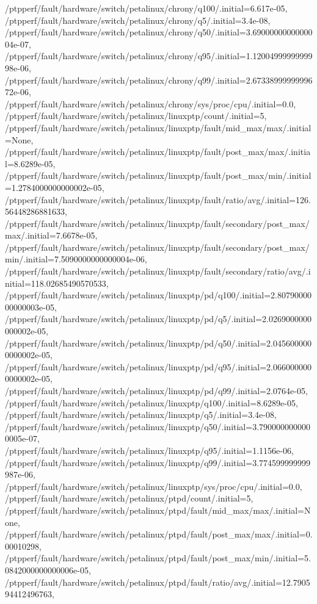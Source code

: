 {    /ptpperf/fault/hardware/switch/petalinux/chrony/q100/.initial=6.617e-05,
    /ptpperf/fault/hardware/switch/petalinux/chrony/q5/.initial=3.4e-08,
    /ptpperf/fault/hardware/switch/petalinux/chrony/q50/.initial=3.6900000000000004e-07,
    /ptpperf/fault/hardware/switch/petalinux/chrony/q95/.initial=1.1200499999999998e-06,
    /ptpperf/fault/hardware/switch/petalinux/chrony/q99/.initial=2.6733899999999672e-06,
    /ptpperf/fault/hardware/switch/petalinux/chrony/sys/proc/cpu/.initial=0.0,
    /ptpperf/fault/hardware/switch/petalinux/linuxptp/count/.initial=5,
    /ptpperf/fault/hardware/switch/petalinux/linuxptp/fault/mid_max/max/.initial=None,
    /ptpperf/fault/hardware/switch/petalinux/linuxptp/fault/post_max/max/.initial=8.6289e-05,
    /ptpperf/fault/hardware/switch/petalinux/linuxptp/fault/post_max/min/.initial=1.2784000000000002e-05,
    /ptpperf/fault/hardware/switch/petalinux/linuxptp/fault/ratio/avg/.initial=126.56448286881633,
    /ptpperf/fault/hardware/switch/petalinux/linuxptp/fault/secondary/post_max/max/.initial=7.6678e-05,
    /ptpperf/fault/hardware/switch/petalinux/linuxptp/fault/secondary/post_max/min/.initial=7.5090000000000004e-06,
    /ptpperf/fault/hardware/switch/petalinux/linuxptp/fault/secondary/ratio/avg/.initial=118.02685490570533,
    /ptpperf/fault/hardware/switch/petalinux/linuxptp/pd/q100/.initial=2.8079000000000003e-05,
    /ptpperf/fault/hardware/switch/petalinux/linuxptp/pd/q5/.initial=2.0269000000000002e-05,
    /ptpperf/fault/hardware/switch/petalinux/linuxptp/pd/q50/.initial=2.0456000000000002e-05,
    /ptpperf/fault/hardware/switch/petalinux/linuxptp/pd/q95/.initial=2.0660000000000002e-05,
    /ptpperf/fault/hardware/switch/petalinux/linuxptp/pd/q99/.initial=2.0764e-05,
    /ptpperf/fault/hardware/switch/petalinux/linuxptp/q100/.initial=8.6289e-05,
    /ptpperf/fault/hardware/switch/petalinux/linuxptp/q5/.initial=3.4e-08,
    /ptpperf/fault/hardware/switch/petalinux/linuxptp/q50/.initial=3.7900000000000005e-07,
    /ptpperf/fault/hardware/switch/petalinux/linuxptp/q95/.initial=1.1156e-06,
    /ptpperf/fault/hardware/switch/petalinux/linuxptp/q99/.initial=3.774599999999987e-06,
    /ptpperf/fault/hardware/switch/petalinux/linuxptp/sys/proc/cpu/.initial=0.0,
    /ptpperf/fault/hardware/switch/petalinux/ptpd/count/.initial=5,
    /ptpperf/fault/hardware/switch/petalinux/ptpd/fault/mid_max/max/.initial=None,
    /ptpperf/fault/hardware/switch/petalinux/ptpd/fault/post_max/max/.initial=0.00010298,
    /ptpperf/fault/hardware/switch/petalinux/ptpd/fault/post_max/min/.initial=5.0842000000000006e-05,
    /ptpperf/fault/hardware/switch/petalinux/ptpd/fault/ratio/avg/.initial=12.790594412496763,
}
